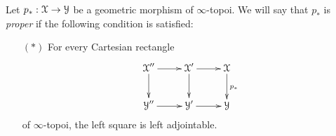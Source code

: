 \begin{definition}\label{smurk}
Let $p_{\ast}: \operatorname{\mathcal{X}} \rightarrow \operatorname{\mathcal{Y}}$ be a geometric morphism of $\infty$-topoi. We will say that
$p_{\ast}$ is {\em proper} if the following condition is satisfied:
\begin{itemize}
\item[$(\ast)$] For every Cartesian rectangle 
$$ \xymatrix{ \calX'' \ar[d] \ar[r] & \calX' \ar[d] \ar[r] & \calX \ar[d]^{p_{\ast}} \\
\calY'' \ar[r] & \calY' \ar[r] & \calY }$$
of $\infty$-topoi, the left square is left adjointable.
\end{itemize}
\end{definition}


